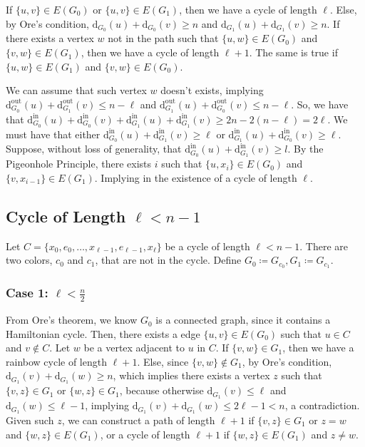 If \( \{u, v\} \in E(G_0) \) or \( \{u, v\} \in E(G_1) \), then we have a cycle of length \( \ell \).
Else, by Ore's condition, \( \text{d}_{G_0}(u) + \text{d}_{G_0}(v) \geq n \) and \( \text{d}_{G_1}(u) + \text{d}_{G_1}(v) \geq n \).
If there exists a vertex \(w\) not in the path such that \( \{u, w\} \in E(G_0) \) and \( \{v, w\} \in E(G_1) \), 
then we have a cycle of length \( \ell + 1 \). The same is true if \( \{u, w\} \in E(G_1) \) and \( \{v, w\} \in E(G_0) \).

We can assume that such vertex \(w\) doesn't exists, implying 
\( \text{d}^{\text{out}}_{G_0}(u) + \text{d}^{\text{out}}_{G_1}(v) \leq n - \ell \) and
\( \text{d}^{\text{out}}_{G_1}(u) + \text{d}^{\text{out}}_{G_0}(v) \leq n - \ell \). 
So, we have that \( \text{d}^{\text{in}}_{G_0}(u) + \text{d}^{\text{in}}_{G_0}(v) + 
\text{d}^{\text{in}}_{G_1}(u) + \text{d}^{\text{in}}_{G_1}(v)  \geq 2 n - 2 ( n - \ell  ) = 2 \ell \). We must have that 
either \( \text{d}^{\text{in}}_{G_0}(u) + \text{d}^{\text{in}}_{G_1}(v) \geq \ell \) or 
\( \text{d}^{\text{in}}_{G_1}(u) + \text{d}^{\text{in}}_{G_0}(v) \geq \ell \).
Suppose, without loss of generality, that \( \text{d}^{\text{in}}_{G_0}(u) + \text{d}^{\text{in}}_{G_1}(v) \geq l \).
By the Pigeonhole Principle, there exists \(i\) such that 
\( \{u, x_i\} \in E(G_0) \) and \( \{v, x_{i-1}\} \in E(G_1) \).
Implying in the existence of a cycle of length \( \ell \).

\subsection{Cycle of Length $\ell < n - 1$}

Let \( C = \{x_0, e_0, \dots, x_{\ell-1}, e_{\ell-1}, x_{\ell}\} \) be a cycle of length \( \ell < n - 1 \).
There are two colors, $c_0$ and $c_1$, that are not in the cycle. Define \(G_0 \coloneqq G_{c_0}, G_1 \coloneqq G_{c_1} \).

\subsubsection{Case 1: \( \ell < \frac{n}{2} \)}

From Ore's theorem, we know \(G_0\) is a connected graph, since it contains a Hamiltonian cycle. 
Then, there exists a edge \( \{u, v\} \in E(G_0) \) such that \( u \in C \) and \( v \not\in C \). 
Let \(w\) be a vertex adjacent to \(u\) in \(C\). 
If \(\{v, w\} \in G_1\), then we have a rainbow cycle of length \( \ell+1 \). 
Else, since \( \{v, w\} \not\in G_1 \), by Ore's condition, \( \text{d}_{G_1}(v) + \text{d}_{G_1}(w) \geq n \),
which implies there exists a vertex \( z \) such that \( \{v, z\} \in G_1 \) or \( \{w, z\} \in G_1 \), because otherwise
\( \text{d}_{G_1}(v) \leq \ell \) and \( \text{d}_{G_1}(w) \leq \ell - 1 \), implying 
\( \text{d}_{G_1}(v) + \text{d}_{G_1}(w) \leq 2\ell - 1 < n \), a contradiction.
Given such \(z\), we can construct a path of length \( \ell+1 \) if \( \{v, z\} \in G_1 \) or 
\( z = w \) and \( \{w, z\} \in E(G_1) \), or a cycle of length \( \ell+1 \) if \( \{w, z\} \in E(G_1) \) and \(z \neq w\).

